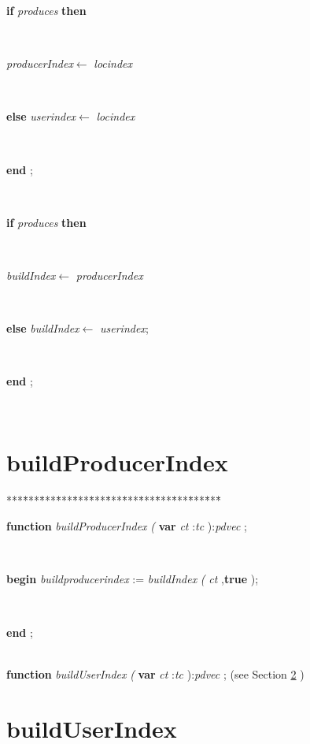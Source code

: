 \begin{tabbing}
\+\parbox{14cm}{\textsf {\textbf {if } \textsf{\textit{produces}} \textbf{ then } }}\\
\parbox{14cm}{\textsf{\textit{producerIndex}$\leftarrow$ \textit{locindex}}}\\
\<\parbox{14cm}{\textsf {\textbf {else } \textsf{\textit{userindex}$\leftarrow$ \textit{locindex}}}}\\
\<\-\<\-\parbox{14cm}{\textsf{\textbf{end} ;}}\\
\+\parbox{14cm}{\textsf {\textbf {if } \textsf{\textit{produces}} \textbf{ then } }}\\
\parbox{14cm}{\textsf{\textit{buildIndex}$\leftarrow$ \textit{producerIndex}}}\\
\-\<\parbox{14cm}{\textsf {\textbf {else } \textsf{\textit{buildIndex}$\leftarrow$ \textit{userindex}}; }}\\
\<\-\parbox{14cm}{\textsf{\textbf{end} ;}}\\
\end{tabbing}
\section{buildProducerIndex}\label{sec:technologies/hash/defineproductlistbuildProducerIndex}

\begin{tabbing}
***\=***\=***\=***\=***\=***\=***\=***\=***\=***\=***\=***\=***\=\kill
\parbox{14cm}{\textsf{\textbf{function}   \textit{buildProducerIndex} \textit{(} \textbf{var}  \textit{ct} :\textit{tc} ):\textit{pdvec}  ;}}\\
\+\parbox{14cm}{\textsf{\textbf{begin}  \textit{buildproducerindex} := \textit{buildIndex} \textit{(} \textit{ct} ,\textbf{true} );}}\\
\<\-\parbox{14cm}{\textsf{\textbf{end} ;}}\\
\+\textsf{\textbf{function}   \textit{buildUserIndex} \textit{(} \textbf{var}  \textit{ct} :\textit{tc} ):\textit{pdvec}  ;} (see Section \ref{sec:technologies/hash/defineproductlist/buildProducerIndexbuildUserIndex} )\\
\end{tabbing}
\section{buildUserIndex}\label{sec:technologies/hash/defineproductlist/buildProducerIndexbuildUserIndex}

